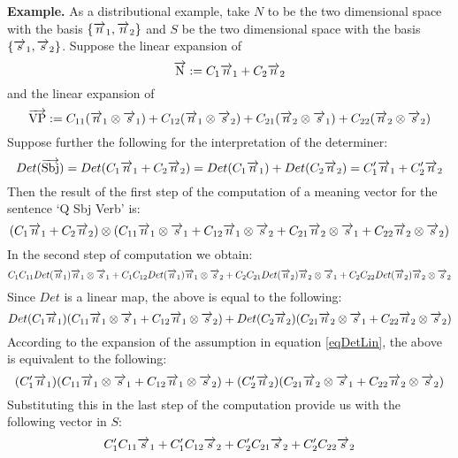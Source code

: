 \noindent
{\bf Example.} 
As a distributional example, take $N$ to be the two dimensional space with the basis $\{\overrightarrow{n}_1, \overrightarrow{n}_2\}$ and $S$ be the two dimensional space with the basis $\{\overrightarrow{s}_1, \overrightarrow{s}_2\}$.  Suppose the linear expansion of 
\[
\overrightarrow{\text{N}} := C_1 \overrightarrow{n}_1 + C_2 \overrightarrow{n}_2
\]
 and the linear expansion of 
 \[
 \overrightarrow{\text{VP}} := C_{11} (\overrightarrow{n}_1 \otimes \overrightarrow{s}_1) + C_{12} (\overrightarrow{n}_1 \otimes \overrightarrow{s}_2) +  C_{21} ( \overrightarrow{n}_2 \otimes \overrightarrow{s}_1) + C_{22} (\overrightarrow{n}_2 \otimes \overrightarrow{s}_2)
 \]
    Suppose further the following for the interpretation of the determiner:
 \begin{equation}\label{eqDetLin}
Det(\overrightarrow{\text{Sbj}}) = Det(C_1 \overrightarrow{n}_1 + C_2 \overrightarrow{n}_2) =  Det(C_1 \overrightarrow{n}_1) + Det(C_2 \overrightarrow{n}_2) =  C'_1 \overrightarrow{n}_1 + C'_2 \overrightarrow{n}_2
\end{equation}
Then the result of the first step of the computation of a meaning vector for the sentence `Q Sbj Verb' is:
\[
(C_1\overrightarrow{n}_1 + C_2 \overrightarrow{n}_2) \otimes (C_{11} \overrightarrow{n}_1 \otimes \overrightarrow{s}_1 + C_{12} \overrightarrow{n}_1 \otimes \overrightarrow{s}_2
+ C_{21} \overrightarrow{n}_2 \otimes \overrightarrow{s}_1 + C_{22} \overrightarrow{n}_2 \otimes \overrightarrow{s}_2)
\]
In the second step of computation we obtain:
\[
C_1C_{11} Det(\overrightarrow{n}_1) \overrightarrow{n}_1 \otimes \overrightarrow{s}_1  + C_1 C_{12} Det(\overrightarrow{n}_1) \overrightarrow{n}_1 \otimes \overrightarrow{s}_2  + C_2 C_{21} Det(\overrightarrow{n}_2) \overrightarrow{n}_2 \otimes \overrightarrow{s}_1 + C_2 C_{22} Det(\overrightarrow{n}_2) \overrightarrow{n}_2 \otimes \overrightarrow{s}_2
\]
Since $Det$ is a linear map, the above is equal to the following:
\[
Det(C_1\overrightarrow{n}_1) (C_{11} \overrightarrow{n}_1 \otimes \overrightarrow{s}_1 + C_{12} \overrightarrow{n}_1 \otimes \overrightarrow{s}_2) + Det(C_2 \overrightarrow{n}_2)(C_{21} \overrightarrow{n}_2 \otimes \overrightarrow{s}_1 + C_{22} \overrightarrow{n}_2 \otimes \overrightarrow{s}_2)
\]
According to the expansion of the assumption in equation \ref{eqDetLin},  the above is equivalent to the following:
\[
(C'_1\overrightarrow{n}_1) (C_{11} \overrightarrow{n}_1 \otimes \overrightarrow{s}_1 + C_{12} \overrightarrow{n}_1 \otimes \overrightarrow{s}_2) + (C'_2 \overrightarrow{n}_2)(C_{21} \overrightarrow{n}_2 \otimes \overrightarrow{s}_1 + C_{22} \overrightarrow{n}_2 \otimes \overrightarrow{s}_2)
\]
Substituting  this in the last step of the computation provide us with the following vector in $S$:
\begin{equation}\label{eqSent}
C'_1 C_{11} \overrightarrow{s}_1 + C'_1 C_{12} \overrightarrow{s}_2 + C'_2 C_{21} \overrightarrow{s}_2 + C'_2 C_{22} \overrightarrow{s}_2
\end{equation}
%

